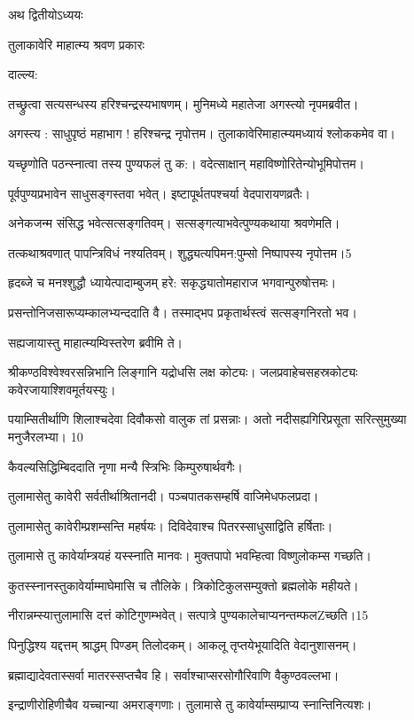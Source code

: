 अथ द्वितीयोऽध्ययः

तुलाकावेरि माहात्म्य श्रवण प्रकारः


दाल्ल्य:

तच्छ्रुत्वा सत्यसन्धस्य हरिश्चन्द्रस्यभाषणम्।
मुनिमध्ये महातेजा अगस्त्यो नृपमब्रवीत।

अगस्त्य : साधुपृष्ठं महाभाग ! हरिश्चन्द्र नृपोत्तम।
तुलाकावेरिमाहात्म्यमध्यायं श्लोककमेव वा।

यच्छृणोति पठन्स्नात्वा तस्य पुण्यफलं तु क:।
वदेत्साक्षान् महाविष्णोरितेन्योभूमिपोत्तम।

पूर्वपुण्यप्रभावेन साधुसङ्गस्तवा भवेत्।
इष्टापूर्थतपश्चर्या वेदपारायणव्रतैः।

अनेकजन्म संसिद्ध भवेत्सत्सङ्गतिवम्।
सत्सङ्गत्याभवेत्पुण्यकथाया श्रवणेमति।

तत्कथाश्रवणात् पापन्त्रिविधं नश्यतिवम्।
शुद्ध्यत्यपिमन:पुम्सो निष्पापस्य नृपोत्तम।5

हृदब्जे च मनश्शुद्धौ ध्यायेत्पादाम्बुजम् हरे:
सकृद्ध्यातोमहाराज भगवान्पुरुषोत्तमः।

प्रसन्तोनिजसारूप्यम्कालभ्यन्ददाति वै।
तस्माद्भप प्रकृतार्थस्त्वं सत्सङ्गनिरतो भव।

सह्यजायास्तु माहात्म्यम्विस्तरेण ब्रवीमि ते।

श्रीकण्ठविश्वेश्वरसन्निभानि
लिङ्गानि यद्रोधसि लक्ष कोट्यः।
जलप्रवाहेचसहस्रकोट्यः
कवेरजायाश्शिवमूर्तयस्युः।

पयाम्सितीर्थाणि शिलाश्चदेवा
दिवौकसो वालुक तां प्रसन्नाः।
अतो नदीसह्यगिरिप्रसूता
सरित्सुमुख्या मनुजैरलभ्या। 10

कैवल्यसिद्धिम्बिददाति नृणा
मन्यै स्त्रिभिः किम्पुरुषार्थवगैः।

तुलामासेतु कावेरी सर्वतीर्थाश्रितानदी।
पञ्चपातकसम्हर्षि वाजिमेधफलप्रदा।

तुलामासेतु कावेरीम्प्रशम्सन्ति महर्षयः।
दिविदेवाश्च पितरस्साधुसाद्विति हर्षिताः।

तुलामासे तु कावेर्याम्त्रयहं यस्स्नाति मानवः।
मुक्तपापो भवम्हित्वा विष्णुलोकम्स गच्छति।

कुतस्स्नानस्तुकावेर्याम्माघेमासि च तौलिके।
त्रिकोटिकुलसम्युक्तो ब्रह्मलोके महीयते।

नीरान्नम्स्यात्तुलामासि दत्तं कोटिगुणम्भवेत्।
सत्पात्रे पुण्यकालेचाप्यनन्तम्फलZच्छति।15

पिनुद्धिश्य यद्दत्तम् श्राद्धम् पिण्डम् तिलोदकम्।
आकलू तृप्तयेभूयादिति वेदानुशासनम्।

ब्रह्माद्यादेवतास्सर्वा मातरस्सप्तचैव हि।
सर्वाश्चाप्सरसोगौरिवाणि वैकुण्ठवल्लभा।

इन्द्राणीरोहिणीचैव यच्चान्या अमराङ्गणाः।
तुलामासे तु कावेर्याम्सम्प्राप्य स्नान्तिनित्यशः।

